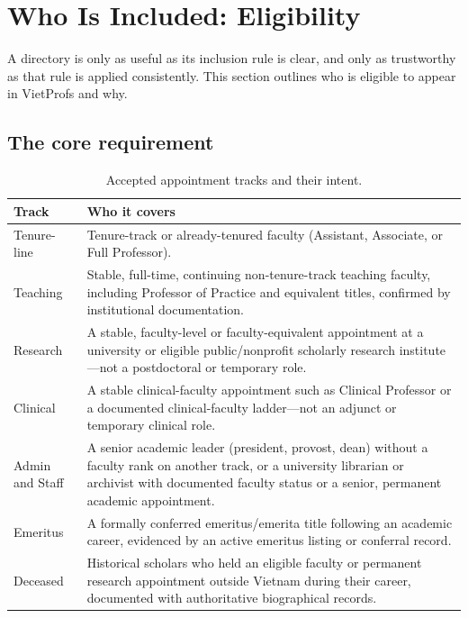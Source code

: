 \documentclass[11pt]{article}
\begin{document}
\section{Who Is Included: Eligibility}
\label{sec:eligibility}
A directory is only as useful as its inclusion rule is clear, and only as trustworthy as that rule is applied consistently.
This section outlines who is eligible to appear in VietProfs and why.

\subsection{The core requirement}

\begin{table}[t]
\centering
\caption{Accepted appointment tracks and their intent.}
\label{tab:tracks}
\small
\begin{tabularx}{\linewidth}{@{}lX@{}}
\toprule
Track & Who it covers \\
\midrule
Tenure-line & Tenure-track or already-tenured faculty (Assistant, Associate, or Full Professor). \\
Teaching & Stable, full-time, continuing non-tenure-track teaching faculty, including Professor of Practice and equivalent titles, confirmed by institutional documentation. \\
Research & A stable, faculty-level or faculty-equivalent appointment at a university or eligible public/nonprofit scholarly research institute---not a postdoctoral or temporary role. \\
Clinical & A stable clinical-faculty appointment such as Clinical Professor or a documented clinical-faculty ladder---not an adjunct or temporary clinical role. \\
Admin and Staff & A senior academic leader (president, provost, dean) without a faculty rank on another track, or a university librarian or archivist with documented faculty status or a senior, permanent academic appointment. \\
Emeritus & A formally conferred emeritus/emerita title following an academic career, evidenced by an active emeritus listing or conferral record. \\
Deceased & Historical scholars who held an eligible faculty or permanent research appointment outside Vietnam during their career, documented with authoritative biographical records. \\
\bottomrule
\end{tabularx}
\end{table}
\end{document}
